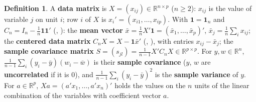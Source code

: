 \documentclass[12pt]{article}
\newcommand{\R}{\mathbb R}
\newcommand{\one}{\mathbf 1}
\theoremstyle{definition}
\newtheorem{definition}[theorem]{Definition}
\begin{document}
\begin{definition}\label{h-def-data}
A \textbf{data matrix} is \(X=(x_{ij})\in\R^{n\times p}\) (\(n\geqslant2\)): \(x_{ij}\) is the value of variable \(j\) on
unit \(i\); row \(i\) of \(X\) is \(x_i'=(x_{i1},\dots,x_{ip})\). With \(\one=\one_n\) and \(C_n=I_n-\frac1n\one\one'\) (, ):
the \textbf{mean vector} \(\bar x=\frac1nX'\one=(\bar x_1,\dots,\bar x_p)'\), \(\bar x_j=\frac1n\sum_ix_{ij}\); the
\textbf{centered data matrix} \(C_nX=X-\one\bar x'\) (, ), with entries \(x_{ij}-\bar x_j\); the \textbf{sample covariance
matrix} \(S=(s_{jl})=\frac1{n-1}X'C_nX\in\R^{p\times p}\). For \(y,w\in\R^n\),
\(\frac1{n-1}\sum_i(y_i-\bar y)(w_i-\bar w)\) is their \textbf{sample covariance} (\(y\), \(w\) are
\textbf{uncorrelated} if it is \(0\)), and \(\frac1{n-1}\sum_i(y_i-\bar y)^2\) is the \textbf{sample variance} of \(y\).
For \(a\in\R^p\), \(Xa=(a'x_1,\dots,a'x_n)'\) holds the values on the \(n\) units of the linear combination of the
variables with coefficient vector \(a\).
\end{definition}
\end{document}
